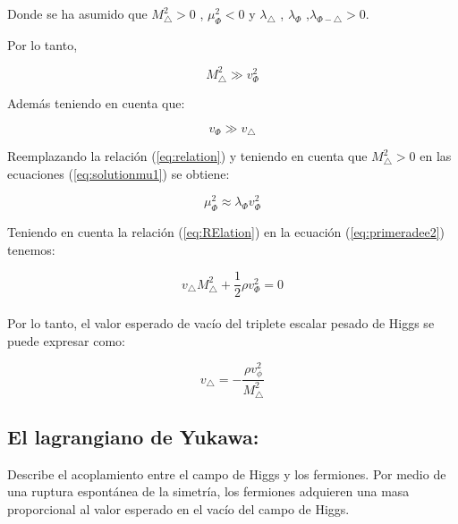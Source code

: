 \documentclass[12pt]{article}
\begin{document}
Donde se ha asumido que $M^{2}_\triangle>0$ , $\mu^{2}_\Phi<0$ y $\lambda_{\triangle }$ , $\lambda_{\Phi }$ ,$ \lambda_{\Phi- \triangle} >0 $. 


Por lo tanto, 




 \begin{equation}
     \label{eq:RElation}
     M^{2}_\triangle \gg v^{2}_\Phi
 \end{equation}

Además teniendo en cuenta que:

\begin{equation}
    \label{eq:relation}
    v_\Phi \gg v_\triangle
\end{equation}

Reemplazando la relación (\ref{eq:relation}) y teniendo en cuenta que $M^{2}_\triangle>0$ en las ecuaciones (\ref{eq:solutionmu1}) se obtiene: 

\begin{equation}
   \label{eq:M1}
   \mu^{2}_\Phi \approx  \lambda_{\Phi} v^{2}_\Phi 
\end{equation}

Teniendo en cuenta la relación (\ref{eq:RElation}) en la ecuación (\ref{eq:primeradee2})  tenemos:

\begin{equation}
\label{eq:pri2}
   v_\triangle M^{2}_\triangle   + \frac{1}{2}\rho v^{2}_\Phi = 0
\end{equation} \\

Por lo tanto, el valor esperado de vacío del triplete escalar pesado de Higgs se puede expresar como:

\begin{equation}
    \label{eq:valoresperadodevacío}
     v_\triangle = - \frac{\rho v^{2}_\phi}{M^{2}_\triangle}
\end{equation}


\subsection{El lagrangiano de Yukawa:} 

Describe el acoplamiento entre el campo de Higgs y los fermiones. Por medio de una ruptura espontánea de la simetría, los fermiones adquieren una masa proporcional al valor esperado en el vacío del campo de Higgs. 
\end{document}
